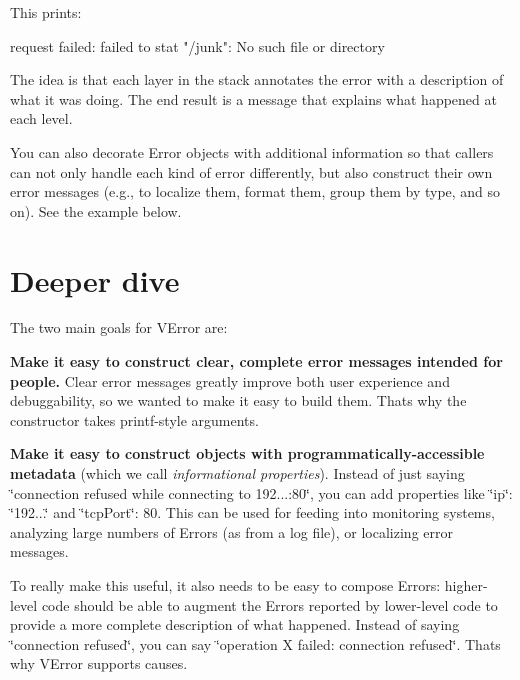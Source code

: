 This prints\+: \begin{DoxyVerb}request failed: failed to stat "/junk": No such file or directory
\end{DoxyVerb}


The idea is that each layer in the stack annotates the error with a description of what it was doing. The end result is a message that explains what happened at each level.

You can also decorate Error objects with additional information so that callers can not only handle each kind of error differently, but also construct their own error messages (e.\+g., to localize them, format them, group them by type, and so on). See the example below.

\section*{Deeper dive}

The two main goals for V\+Error are\+:


\begin{DoxyItemize}
\item {\bfseries Make it easy to construct clear, complete error messages intended for people.} Clear error messages greatly improve both user experience and debuggability, so we wanted to make it easy to build them. That\textquotesingle{}s why the constructor takes printf-\/style arguments.
\item {\bfseries Make it easy to construct objects with programmatically-\/accessible metadata} (which we call {\itshape informational properties}). Instead of just saying \char`\"{}connection refused while connecting to 192...\+:80\char`\"{}, you can add properties like {\ttfamily \char`\"{}ip\char`\"{}\+: \char`\"{}192...\char`\"{}} and {\ttfamily \char`\"{}tcp\+Port\char`\"{}\+: 80}. This can be used for feeding into monitoring systems, analyzing large numbers of Errors (as from a log file), or localizing error messages.
\end{DoxyItemize}

To really make this useful, it also needs to be easy to compose Errors\+: higher-\/level code should be able to augment the Errors reported by lower-\/level code to provide a more complete description of what happened. Instead of saying \char`\"{}connection refused\char`\"{}, you can say \char`\"{}operation X failed\+: connection refused\char`\"{}. That\textquotesingle{}s why V\+Error supports {\ttfamily causes}.

